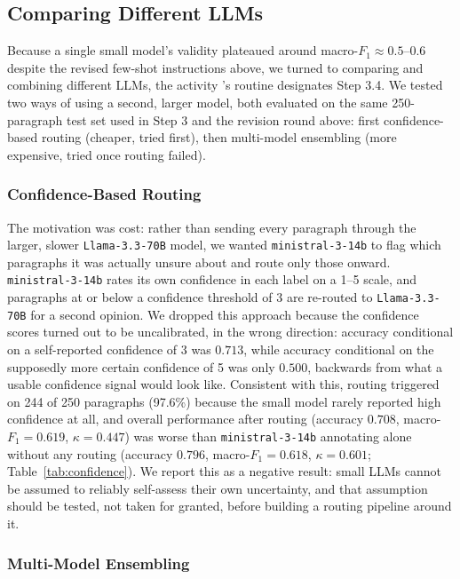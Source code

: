 \documentclass[a4paper,oneside,bibliography=totoc]{scrartcl}
\begin{document}
\subsection{Comparing Different LLMs}

Because a single small model's validity plateaued around macro-$F_1 \approx 0.5$--$0.6$ despite the revised few-shot instructions above, we turned to comparing and combining different LLMs, the activity \citet{freudenthalerbacchuss}'s routine designates Step 3.4. We tested two ways of using a second, larger model, both evaluated on the same 250-paragraph test set used in Step 3 and the revision round above: first confidence-based routing (cheaper, tried first), then multi-model ensembling (more expensive, tried once routing failed).

\subsubsection{Confidence-Based Routing}
\label{sec:method-confidence}

The motivation was cost: rather than sending every paragraph through the larger, slower \texttt{Llama-3.3-70B} model, we wanted \texttt{ministral-3-14b} to flag which paragraphs it was actually unsure about and route only those onward. \texttt{ministral-3-14b} rates its own confidence in each label on a 1--5 scale, and paragraphs at or below a confidence threshold of 3 are re-routed to \texttt{Llama-3.3-70B} for a second opinion. We dropped this approach because the confidence scores turned out to be uncalibrated, in the wrong direction: accuracy conditional on a self-reported confidence of 3 was $0.713$, while accuracy conditional on the supposedly more certain confidence of 5 was only $0.500$, backwards from what a usable confidence signal would look like. Consistent with this, routing triggered on 244 of 250 paragraphs (97.6\%) because the small model rarely reported high confidence at all, and overall performance after routing (accuracy $0.708$, macro-$F_1 = 0.619$, $\kappa = 0.447$) was worse than \texttt{ministral-3-14b} annotating alone without any routing (accuracy $0.796$, macro-$F_1 = 0.618$, $\kappa = 0.601$; Table~\ref{tab:confidence}). We report this as a negative result: small LLMs cannot be assumed to reliably self-assess their own uncertainty, and that assumption should be tested, not taken for granted, before building a routing pipeline around it.

\subsubsection{Multi-Model Ensembling}
\label{sec:method-ensemble}
\end{document}
